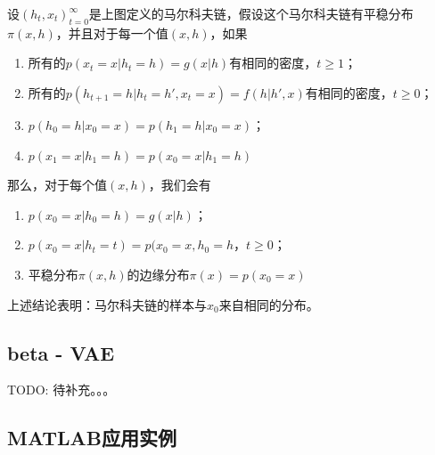         \begin{theorem}
        设$(h_t,x_t)_{t=0}^\infty$是上图定义的马尔科夫链，假设这个马尔科夫链有平稳分布$\pi(x,h)$，并且对于每一个值$(x,h)$，如果
        \begin{enumerate}
        \item 所有的$p(x_t=x|h_t=h) = g(x|h)$有相同的密度，$t \geqslant 1$；
        \item 所有的$p(h_{t+1}=h|h_t=h',x_t=x) = f(h|h',x)$有相同的密度，$t \geqslant0 $；
        \item $p(h_0=h|x_0=x) = p(h_1=h|x_0=x)$；
        \item $p(x_1=x|h_1=h) = p(x_0=x|h_1=h)$
        \end{enumerate}
        那么，对于每个值$(x,h)$，我们会有
        \begin{enumerate}
        \item $p(x_0=x|h_0=h) = g(x|h)$；
        \item $p(x_0=x|h_t=t)=p(x_0=x,h_0=h$，$t \geqslant 0$；
        \item 平稳分布$\pi(x,h)$的边缘分布$\pi(x) = p(x_0 = x)$
        \end{enumerate}
        \end{theorem}
        上述结论表明：马尔科夫链的样本与$x_0$来自相同的分布。
    \subsection{beta - VAE}
        TODO: 待补充。。。
    \subsection{MATLAB应用实例}
